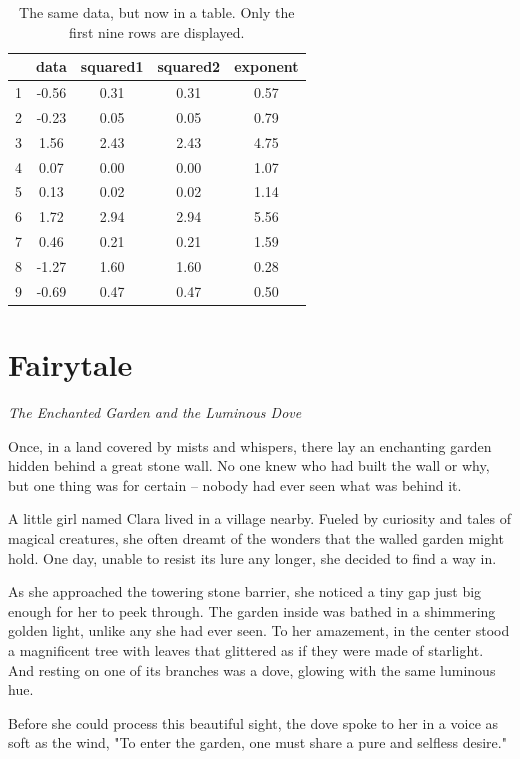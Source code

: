 \documentclass[12pt]{article}
\begin{document}
\begin{table}[!hb]
\centering
\caption{The same data, but now in a table. Only the first nine rows are displayed.}
\begin{tabular}{@{}ccccc@{}}
\toprule
  & data & squared1 & squared2 & exponent \\ \midrule
1 & -0.56 & 0.31 & 0.31 & 0.57 \\
2 & -0.23 & 0.05 & 0.05 & 0.79 \\
3 & 1.56 & 2.43 & 2.43 & 4.75 \\
4 & 0.07 & 0.00 & 0.00 & 1.07 \\
5 & 0.13 & 0.02 & 0.02 & 1.14 \\
6 & 1.72 & 2.94 & 2.94 & 5.56 \\
7 & 0.46 & 0.21 & 0.21 & 1.59 \\
8 & -1.27 & 1.60 & 1.60 & 0.28 \\
9 & -0.69 & 0.47 & 0.47 & 0.50 \\ \bottomrule
\end{tabular}
\end{table}

\section{Fairytale}

\textit{The Enchanted Garden and the Luminous Dove}

Once, in a land covered by mists and whispers, there lay an enchanting garden hidden behind a great stone wall. No one knew who had built the wall or why, but one thing was for certain – nobody had ever seen what was behind it.

A little girl named Clara lived in a village nearby. Fueled by curiosity and tales of magical creatures, she often dreamt of the wonders that the walled garden might hold. One day, unable to resist its lure any longer, she decided to find a way in.

As she approached the towering stone barrier, she noticed a tiny gap just big enough for her to peek through. The garden inside was bathed in a shimmering golden light, unlike any she had ever seen. To her amazement, in the center stood a magnificent tree with leaves that glittered as if they were made of starlight. And resting on one of its branches was a dove, glowing with the same luminous hue.

Before she could process this beautiful sight, the dove spoke to her in a voice as soft as the wind, "To enter the garden, one must share a pure and selfless desire."
\end{document}
